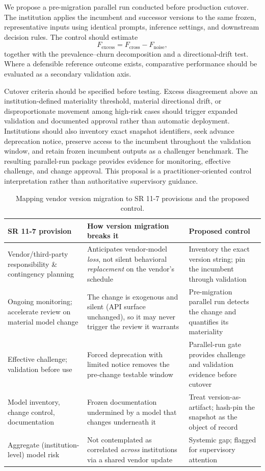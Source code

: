 \documentclass[11pt]{article}
\begin{document}
We propose a pre-migration parallel run conducted before production cutover. The institution applies the incumbent and successor versions to the same frozen, representative inputs using identical prompts, inference settings, and downstream decision rules. The control should estimate
\begin{equation}
F_{\mathrm{excess}} = F_{\mathrm{cross}} - F_{\mathrm{noise}},
\end{equation}
together with the prevalence--churn decomposition and a directional-drift test. Where a defensible reference outcome exists, comparative performance should be evaluated as a secondary validation axis.

Cutover criteria should be specified before testing. Excess disagreement above an institution-defined materiality threshold, material directional drift, or disproportionate movement among high-risk cases should trigger expanded validation and documented approval rather than automatic deployment. Institutions should also inventory exact snapshot identifiers, seek advance deprecation notice, preserve access to the incumbent throughout the validation window, and retain frozen incumbent outputs as a challenger benchmark. The resulting parallel-run package provides evidence for monitoring, effective challenge, and change approval. This proposal is a practitioner-oriented control interpretation rather than authoritative supervisory guidance.

\begin{table}[t]
\centering
\caption{Mapping vendor version migration to SR 11-7 provisions and the proposed control.}
\label{tab:gov}
\small
\begin{tabular}{@{}p{}p{}p{}@{}}
\toprule
SR 11-7 provision & How version migration breaks it & Proposed control \\
\midrule
Vendor/third-party responsibility \& contingency planning & Anticipates vendor-model \emph{loss}, not silent behavioral \emph{replacement} on the vendor's schedule & Inventory the exact version string; pin the incumbent through validation \\
Ongoing monitoring; accelerate review on material model change & The change is exogenous and silent (API surface unchanged), so it may never trigger the review it warrants & Pre-migration parallel run detects the change and quantifies its materiality \\
Effective challenge; validation before use & Forced deprecation with limited notice removes the pre-change testable window & Parallel-run gate provides challenge and validation evidence before cutover \\
Model inventory, change control, documentation & Frozen documentation undermined by a model that changes underneath it & Treat version-as-artifact; hash-pin the snapshot as the object of record \\
Aggregate (institution-level) model risk & Not contemplated as correlated \emph{across} institutions via a shared vendor update & Systemic gap; flagged for supervisory attention \\
\bottomrule
\end{tabular}
\end{table}
\end{document}
